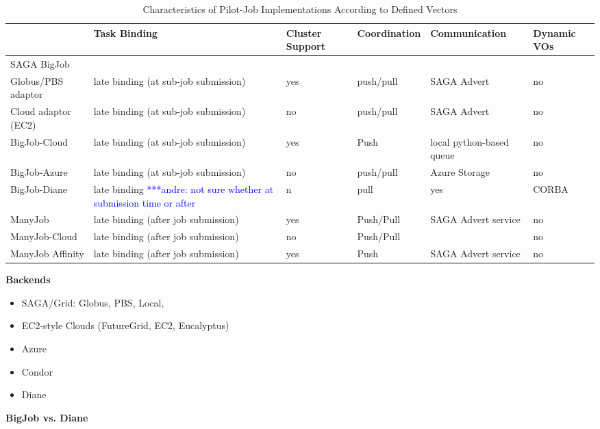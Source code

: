 \documentclass[]{article}
\newcommand{\alnote}[1]{ {\textcolor{blue} { ***andre: #1 }}}
\newcommand{\alnote}[1]{}
\begin{document}
\begin{table}[t]
\begin{tabular}{|l|p{2.5cm}|p{2cm}|p{2cm}|p{2cm}|p{2cm}|}
	\hline
	&\textbf{Task Binding} &\textbf{Cluster Support} &\textbf{Coordina\-tion} & \textbf{Communica\-tion} &\textbf{Dynamic VOs}\\
	\hline
	SAGA BigJob & &&&&\\
	\hline
	\hspace{4mm} Globus/PBS adaptor  &late binding (at sub-job submission)  
									 &yes &push/pull &SAGA Advert &no\\  
	\hline
	\hspace{4mm} Cloud adaptor (EC2) &late binding (at sub-job submission)  
									 &no &push/pull&SAGA Advert &no\\ 
	\hline
 	BigJob-Cloud &late binding (at sub-job submission) &yes &Push 
				 &local python-based queue &no\\ 
	\hline
	BigJob-Azure &late binding (at sub-job submission)
	             &no &push/pull &Azure Storage &no\\ 
	\hline
    BigJob-Diane &late binding \alnote{not sure whether at submission time or after} &n &pull &yes &CORBA\\ 
	\hline
    ManyJob &late binding (after job submission) &yes &Push/Pull &SAGA Advert service&no\\
	\hline
 	ManyJob-Cloud &late binding (after job submission) &no &Push/Pull & &no\\
	\hline 
	ManyJob Affinity &late binding (after job submission) &yes &Push &SAGA Advert service &no\\
	\hline
\end{tabular}
\caption{Characteristics of Pilot-Job Implementations According 
		to Defined Vectors}
\end{table}		
		
		
\vspace{10 mm}

\textbf{Backends}
\begin{itemize}
    \item SAGA/Grid: Globus, PBS, Local, 
    \item EC2-style Clouds (FutureGrid, EC2, Eucalyptus)
    \item Azure
    \item Condor
    \item Diane
\end{itemize}


\textbf{BigJob vs. Diane}
\end{document}
